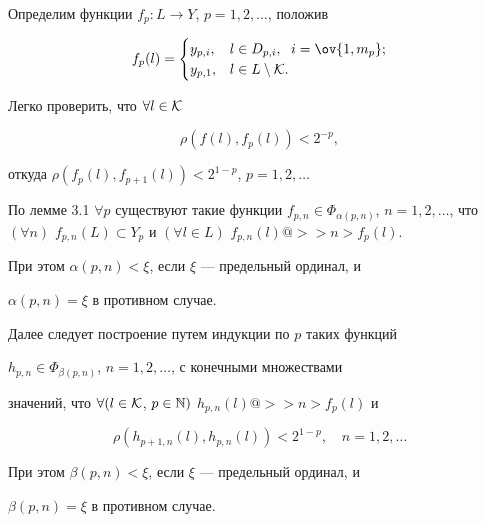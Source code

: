 \begin{pf}
 


Определим функции $f_p:L\to Y$, $p=1,2,\dotsc$, положив 


$$ 


f_p(l)= 


\begin{cases} 


y_{p,i}, & l\in D_{p,i},\ \; i=\ov{1,m_p};\\ 


y_{p,1}, & l\in L\setminus\cal K. 


\end{cases} 


$$ 


Легко проверить, что $\forall l\in\cal K$ 


\begin{equation} 


\rho(f(l),f_p(l))<2^{-p}, 


\end{equation} 


откуда $\rho(f_p(l),f_{p+1}(l))<2^{1-p}$, $p=1,2,\dotsc$ 


 


По лемме 3.1 $\forall p$ существуют такие функции $f_{p,n}\in 


\Phi_{\alpha(p,n)}$, $n=1,2,\dotsc$, что $(\forall n)$ $f_{p,n}(L) 


\subset Y_p$ и $(\forall l\in L)$ $f_{p,n}(l)@>>n>f_p(l)$. 


При этом $\alpha(p,n)<\xi$, если $\xi$ --- предельный ординал, и 


$\alpha(p,n)=\xi$ в противном случае. 


 


Далее следует построение путем индукции по $p$ таких функций 


$h_{p,n}\in \Phi_{\beta(p,n)}$, $n=1,2,\dotsc$, с конечными множествами 


значений, что $\forall(l\in\cal K$, $p\in\Bbb N)$ $h_{p,n}(l)@>>n>f_p(l)$ и 


\begin{equation} 


\rho(h_{p+1,n}(l),h_{p,n}(l))<2^{1-p},\quad n=1,2,\dotsc 


\end{equation} 


При этом $\beta(p,n)<\xi$, если $\xi$ --- предельный ординал, и 


$\beta(p,n)=\xi$ в противном случае. 



\end{pf}

